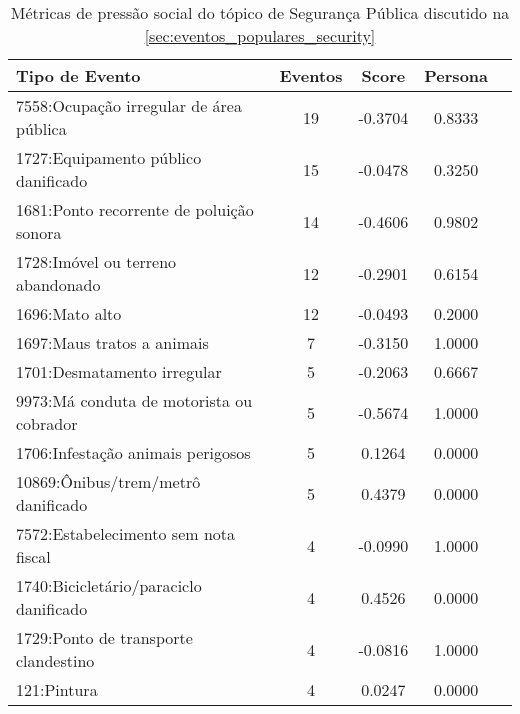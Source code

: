 \begin{table}[htbp]
	\centering
	\caption{Métricas de pressão social do tópico de Segurança Pública discutido na \autoref{sec:eventos_populares_security}}
	\label{tab:eventos_populares_security}
	\begin{tabular}{|l|c|c|c|c|}
		\hline
		\textbf{Tipo de Evento}                     & \textbf{Eventos} & \textbf{Score} & \textbf{Persona} \\
		\hline
		7558:Ocupação irregular de área pública     & 19               & -0.3704        & 0.8333           \\
		\hline
		1727:Equipamento público danificado         & 15               & -0.0478        & 0.3250           \\
		\hline
		1681:Ponto recorrente de poluição sonora    & 14               & -0.4606        & 0.9802           \\
		\hline
		1728:Imóvel ou terreno abandonado           & 12               & -0.2901        & 0.6154           \\
		\hline
		1696:Mato alto                              & 12               & -0.0493        & 0.2000           \\
		\hline
		1697:Maus tratos a animais                  & 7                & -0.3150        & 1.0000           \\
		\hline
		1701:Desmatamento irregular                 & 5                & -0.2063        & 0.6667           \\
		\hline
		9973:Má conduta de motorista ou cobrador    & 5                & -0.5674        & 1.0000           \\
		\hline
		1706:Infestação animais perigosos           & 5                & 0.1264         & 0.0000           \\
		\hline
		10869:Ônibus/trem/metrô danificado          & 5                & 0.4379         & 0.0000           \\
		\hline
		7572:Estabelecimento sem nota fiscal        & 4                & -0.0990        & 1.0000           \\
		\hline
		1740:Bicicletário/paraciclo danificado      & 4                & 0.4526         & 0.0000           \\
		\hline
		1729:Ponto de transporte clandestino        & 4                & -0.0816        & 1.0000           \\
		\hline
		121:Pintura                                 & 4                & 0.0247         & 0.0000           \\

\end{tabular}
\end{table}
